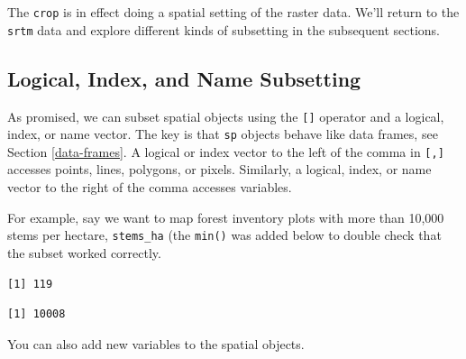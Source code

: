 \documentclass[]{krantz}
\makeatletter
\newenvironment{Shaded}{\begin{snugshade}}{\end{snugshade}}
\newcommand{\DecValTok}[1]{\textcolor[rgb]{0.06,0.06,0.06}{#1}}
\newcommand{\ErrorTok}[1]{\textcolor[rgb]{0.14,0.14,0.14}{\textbf{#1}}}
\newcommand{\FloatTok}[1]{\textcolor[rgb]{0.06,0.06,0.06}{#1}}
\newcommand{\KeywordTok}[1]{\textcolor[rgb]{0.27,0.27,0.27}{\textbf{#1}}}
\newcommand{\NormalTok}[1]{#1}
\newcommand{\OperatorTok}[1]{\textcolor[rgb]{0.43,0.43,0.43}{\textbf{#1}}}
\newcommand{\StringTok}[1]{\textcolor[rgb]{0.5,0.5,0.5}{#1}}
\newenvironment{kframe}{%
\medskip{}
\setlength{\fboxsep}{.8em}
 \def\at@end@of@kframe{}%
 \ifinner\ifhmode%
  \def\at@end@of@kframe{\end{minipage}}%
  \begin{minipage}{\columnwidth}%
 \fi\fi%
 \def\FrameCommand##1{\hskip\@totalleftmargin \hskip-\fboxsep
 \colorbox{shadecolor}{##1}\hskip-\fboxsep
     \hskip-\linewidth \hskip-\@totalleftmargin \hskip\columnwidth}%
 \MakeFramed {\advance\hsize-\width
   \@totalleftmargin\z@ \linewidth\hsize
   \@setminipage}}%
 {\par\unskip\endMakeFramed%
 \at@end@of@kframe}
\renewenvironment{Shaded}{\begin{kframe}}{\end{kframe}}
\makeatother
\begin{document}
The \texttt{crop} is in effect doing a spatial setting of the raster data. We'll return to the \texttt{srtm} data and explore different kinds of subsetting in the subsequent sections.

\hypertarget{logical-index-and-name-subsetting}{%
\subsection{Logical, Index, and Name Subsetting}\label{logical-index-and-name-subsetting}}

As promised, we can subset spatial objects using the \texttt{{[}{]}} operator and a logical, index, or name vector. The key is that \texttt{sp} objects behave like data frames, see Section \ref{data-frames}. A logical or index vector to the left of the comma in \texttt{{[},{]}} accesses points, lines, polygons, or pixels. Similarly, a logical, index, or name vector to the right of the comma accesses variables.

For example, say we want to map forest inventory plots with more than 10,000 stems per hectare, \texttt{stems\_ha} (the \texttt{min()} was added below to double check that the subset worked correctly.

\begin{Shaded}
\end{Shaded}

\begin{verbatim}
[1] 119
\end{verbatim}

\begin{Shaded}
\end{Shaded}

\begin{verbatim}
[1] 10008
\end{verbatim}

You can also add new variables to the spatial objects.
\end{document}
